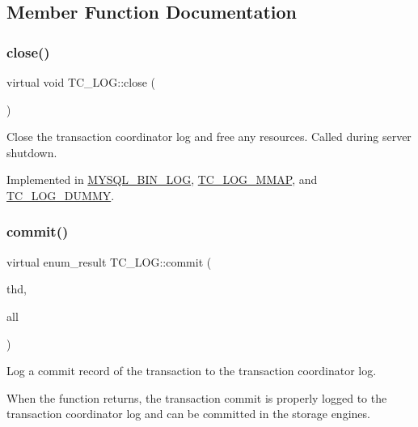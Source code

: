 \subsection{Member Function Documentation}
\mbox{\label{classTC__LOG_a645b5d1b49c4c4396d327eef07e2dd53}} 
\subsubsection{\texorpdfstring{close()}{close()}}
{\footnotesize\ttfamily virtual void T\+C\+\_\+\+L\+O\+G\+::close (\begin{DoxyParamCaption}{ }\end{DoxyParamCaption})\hspace{0.3cm}{\ttfamily [pure virtual]}}

Close the transaction coordinator log and free any resources. Called during server shutdown. 

Implemented in \mbox{\hyperlink{group__Binary__Log_ga22e829bf97dfac49c3b05a2cbdbaf7cb}{M\+Y\+S\+Q\+L\+\_\+\+B\+I\+N\+\_\+\+L\+OG}}, \mbox{\hyperlink{classTC__LOG__MMAP_aefc50f2b1eeb68743a1ab72219f85db4}{T\+C\+\_\+\+L\+O\+G\+\_\+\+M\+M\+AP}}, and \mbox{\hyperlink{classTC__LOG__DUMMY_adb7792f21f5a090a7d71a646d2ebf82f}{T\+C\+\_\+\+L\+O\+G\+\_\+\+D\+U\+M\+MY}}.

\mbox{\label{classTC__LOG_a3f9ef43db745a798f8b361eb0b93ff22}} 
\subsubsection{\texorpdfstring{commit()}{commit()}}
{\footnotesize\ttfamily virtual enum\+\_\+result T\+C\+\_\+\+L\+O\+G\+::commit (\begin{DoxyParamCaption}\item[{T\+HD $\ast$}]{thd,  }\item[{bool}]{all }\end{DoxyParamCaption})\hspace{0.3cm}{\ttfamily [pure virtual]}}

Log a commit record of the transaction to the transaction coordinator log.

When the function returns, the transaction commit is properly logged to the transaction coordinator log and can be committed in the storage engines.


